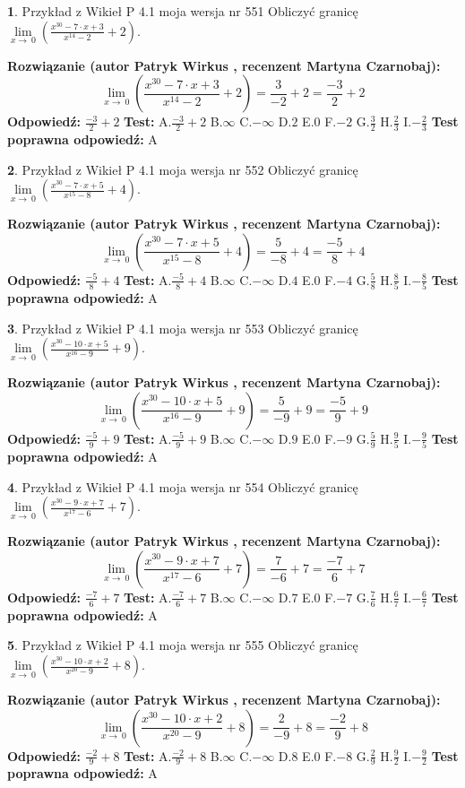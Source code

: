 \documentclass[12pt, a4paper]{article}
\theoremstyle{definition} %
\newtheorem{zad}{}
\newcommand{\zadStart}[1]{\begin{zad}#1\newline}
\newcommand{\zadStop}{\end{zad}}
\newcommand{\rozwStart}[2]{\noindent \textbf{Rozwiązanie (autor #1 , recenzent #2): }\newline}
\newcommand{\rozwStop}{\newline}
\newcommand{\odpStart}{\noindent \textbf{Odpowiedź:}\newline}
\newcommand{\odpStop}{\newline}
\newcommand{\testStart}{\noindent \textbf{Test:}\newline}
\newcommand{\testStop}{\newline}
\newcommand{\kluczStart}{\noindent \textbf{Test poprawna odpowiedź:}\newline}
\newcommand{\kluczStop}{\newline}
\begin{document}
\zadStart{Przykład z Wikieł P 4.1 moja wersja nr 551}
Obliczyć granicę $\lim\limits_{x\to\ 0}(\frac{x^{30}-7 \cdot x +3}{x^{14}-2}+2)$.
\zadStop
\rozwStart{Patryk Wirkus}{Martyna Czarnobaj}
$$\lim\limits_{x\to\ 0}(\frac{x^{30}-7 \cdot x +3}{x^{14}-2}+2)=\frac{3}{-2}+2=\frac{-3}{2}+2$$
\rozwStop
\odpStart
$\frac{-3}{2}+2$
\odpStop
\testStart
A.$\frac{-3}{2}+2$
B.$\infty$
C.$-\infty$
D.$2$
E.$0$
F.$-2$
G.$\frac{3}{2}$
H.$\frac{2}{3}$
I.$-\frac{2}{3}$
\testStop
\kluczStart
A
\kluczStop



\zadStart{Przykład z Wikieł P 4.1 moja wersja nr 552}
Obliczyć granicę $\lim\limits_{x\to\ 0}(\frac{x^{30}-7 \cdot x +5}{x^{15}-8}+4)$.
\zadStop
\rozwStart{Patryk Wirkus}{Martyna Czarnobaj}
$$\lim\limits_{x\to\ 0}(\frac{x^{30}-7 \cdot x +5}{x^{15}-8}+4)=\frac{5}{-8}+4=\frac{-5}{8}+4$$
\rozwStop
\odpStart
$\frac{-5}{8}+4$
\odpStop
\testStart
A.$\frac{-5}{8}+4$
B.$\infty$
C.$-\infty$
D.$4$
E.$0$
F.$-4$
G.$\frac{5}{8}$
H.$\frac{8}{5}$
I.$-\frac{8}{5}$
\testStop
\kluczStart
A
\kluczStop



\zadStart{Przykład z Wikieł P 4.1 moja wersja nr 553}
Obliczyć granicę $\lim\limits_{x\to\ 0}(\frac{x^{30}-10 \cdot x +5}{x^{16}-9}+9)$.
\zadStop
\rozwStart{Patryk Wirkus}{Martyna Czarnobaj}
$$\lim\limits_{x\to\ 0}(\frac{x^{30}-10 \cdot x +5}{x^{16}-9}+9)=\frac{5}{-9}+9=\frac{-5}{9}+9$$
\rozwStop
\odpStart
$\frac{-5}{9}+9$
\odpStop
\testStart
A.$\frac{-5}{9}+9$
B.$\infty$
C.$-\infty$
D.$9$
E.$0$
F.$-9$
G.$\frac{5}{9}$
H.$\frac{9}{5}$
I.$-\frac{9}{5}$
\testStop
\kluczStart
A
\kluczStop



\zadStart{Przykład z Wikieł P 4.1 moja wersja nr 554}
Obliczyć granicę $\lim\limits_{x\to\ 0}(\frac{x^{30}-9 \cdot x +7}{x^{17}-6}+7)$.
\zadStop
\rozwStart{Patryk Wirkus}{Martyna Czarnobaj}
$$\lim\limits_{x\to\ 0}(\frac{x^{30}-9 \cdot x +7}{x^{17}-6}+7)=\frac{7}{-6}+7=\frac{-7}{6}+7$$
\rozwStop
\odpStart
$\frac{-7}{6}+7$
\odpStop
\testStart
A.$\frac{-7}{6}+7$
B.$\infty$
C.$-\infty$
D.$7$
E.$0$
F.$-7$
G.$\frac{7}{6}$
H.$\frac{6}{7}$
I.$-\frac{6}{7}$
\testStop
\kluczStart
A
\kluczStop



\zadStart{Przykład z Wikieł P 4.1 moja wersja nr 555}
Obliczyć granicę $\lim\limits_{x\to\ 0}(\frac{x^{30}-10 \cdot x +2}{x^{20}-9}+8)$.
\zadStop
\rozwStart{Patryk Wirkus}{Martyna Czarnobaj}
$$\lim\limits_{x\to\ 0}(\frac{x^{30}-10 \cdot x +2}{x^{20}-9}+8)=\frac{2}{-9}+8=\frac{-2}{9}+8$$
\rozwStop
\odpStart
$\frac{-2}{9}+8$
\odpStop
\testStart
A.$\frac{-2}{9}+8$
B.$\infty$
C.$-\infty$
D.$8$
E.$0$
F.$-8$
G.$\frac{2}{9}$
H.$\frac{9}{2}$
I.$-\frac{9}{2}$
\testStop
\kluczStart
A
\kluczStop
\end{document}
